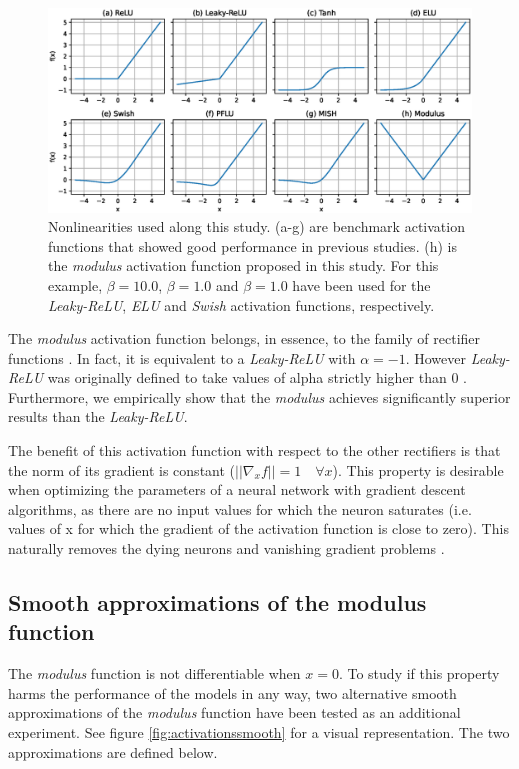 \begin{figure}
	\centering
	\includegraphics[width=1.0\linewidth]{modulus/images/activations}
	\caption{Nonlinearities used along this study. (a-g) are benchmark activation functions that showed good performance in previous studies. (h) is the \textit{modulus} activation function proposed in this study. For this example, $\beta=10.0$, $\beta=1.0$ and $\beta=1.0$ have been used for the \textit{Leaky-ReLU}, \textit{ELU} and \textit{Swish} activation functions, respectively.}
	\label{fig:activations}
\end{figure}

The \textit{modulus} activation function belongs, in essence, to the family of rectifier functions \autocite{glorot2015} . In fact, it is equivalent to a \textit{Leaky-ReLU} with $\alpha=-1$. However \textit{Leaky-ReLU} was originally defined to take values of alpha strictly higher than 0 \autocite{xu2015}. Furthermore, we empirically show that the \textit{modulus} achieves significantly superior results than the \textit{Leaky-ReLU}.

The benefit of this activation function with respect to the other rectifiers is that the norm of its gradient is constant ($||\nabla_x f|| = 1 \quad \forall x$). This property is desirable when optimizing the parameters of a neural network with gradient descent algorithms, as there are no input values for which the neuron saturates \autocite{glorot2010} (i.e. values of x for which the gradient of the activation function is close to zero). This naturally removes the dying neurons \autocite{lu2020} and vanishing gradient problems \autocite{pascanu13, hochreiter1998, Hochreiter2001}.

\subsection{Smooth approximations of the modulus function}
The \textit{modulus} function is not differentiable when $x=0$. To study if this property harms the performance of the models in any way, two alternative smooth approximations of the \textit{modulus} function have been tested as an additional experiment. See figure \ref{fig:activationssmooth} for a visual representation. The two approximations are defined below.


